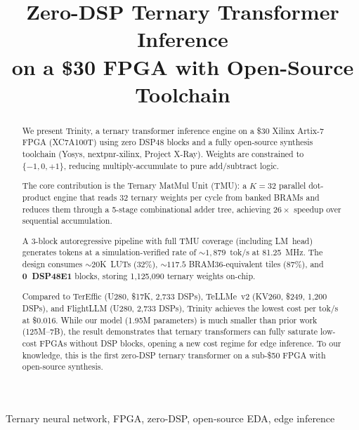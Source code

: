 \documentclass[conference]{IEEEtran}
\begin{document}
\title{Zero-DSP Ternary Transformer Inference\\on a \$30 FPGA with Open-Source Toolchain}

\author{
}

\maketitle

\begin{abstract}
We present Trinity, a ternary transformer inference engine on a \$30 Xilinx
Artix-7 FPGA (XC7A100T) using zero DSP48 blocks and a fully open-source
synthesis toolchain (Yosys, nextpnr-xilinx, Project X-Ray).  Weights are
constrained to $\{-1, 0, +1\}$, reducing multiply-accumulate to pure
add/subtract logic.

The core contribution is the Ternary MatMul Unit (TMU): a $K\!=\!32$ parallel
dot-product engine that reads 32 ternary weights per cycle from banked BRAMs
and reduces them through a 5-stage combinational adder tree, achieving
$26\times$ speedup over sequential accumulation.

A 3-block autoregressive pipeline with full TMU coverage (including LM~head)
generates tokens at a simulation-verified rate of ${\sim}1{,}879$~tok/s at
81.25~MHz.  The design consumes ${\sim}20$K~LUTs (32\%), ${\sim}117.5$
BRAM36-equivalent tiles (87\%), and \textbf{0~DSP48E1} blocks, storing
1,125,090 ternary weights on-chip.

Compared to TerEffic (U280, \$17K, 2,733 DSPs), TeLLMe~v2 (KV260, \$249,
1,200 DSPs), and FlightLLM (U280, 2,733 DSPs), Trinity achieves the lowest
cost per tok/s at \$0.016.  While our model (1.95M parameters) is much smaller
than prior work (125M--7B), the result demonstrates that ternary transformers
can fully saturate low-cost FPGAs without DSP blocks, opening a new cost regime
for edge inference.  To our knowledge, this is the first zero-DSP ternary
transformer on a sub-\$50 FPGA with open-source synthesis.
\end{abstract}

\begin{IEEEkeywords}
Ternary neural network, FPGA, zero-DSP, open-source EDA, edge inference
\end{IEEEkeywords}
\end{document}
